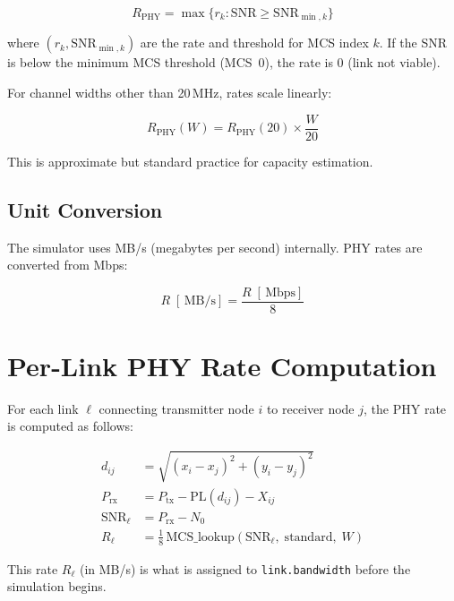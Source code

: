 \documentclass[11pt,letterpaper]{article}
\newcommand{\Mbps}{\,\text{Mbps}}
\newcommand{\MBps}{\,\text{MB/s}}
\begin{document}
\begin{equation}
\label{eq:mcs_select}
R_\text{PHY} = \max\{r_k : \text{SNR} \geq \text{SNR}_{\min,k}\}
\end{equation}

where $(r_k, \text{SNR}_{\min,k})$ are the rate and threshold for MCS index
$k$.  If the SNR is below the minimum MCS threshold (MCS~0), the rate is 0
(link not viable).

For channel widths other than 20\,MHz, rates scale linearly:

\begin{equation}
\label{eq:cw_scale}
R_\text{PHY}(W) = R_\text{PHY}(20) \times \frac{W}{20}
\end{equation}

This is approximate but standard practice for capacity estimation.

\subsection{Unit Conversion}

The simulator uses MB/s (megabytes per second) internally.  PHY rates are
converted from Mbps:

\begin{equation}
\label{eq:unit}
R\;[\MBps] = \frac{R\;[\Mbps]}{8}
\end{equation}

\section{Per-Link PHY Rate Computation}
\label{sec:phyrate}

For each link $\ell$ connecting transmitter node $i$ to receiver node $j$,
the PHY rate is computed as follows:

\begin{align}
d_{ij}    &= \sqrt{(x_i - x_j)^2 + (y_i - y_j)^2} \label{eq:dist} \\
P_\text{rx} &= P_\text{tx} - \text{PL}(d_{ij}) - X_{ij} \label{eq:prx_link} \\
\text{SNR}_\ell &= P_\text{rx} - N_0 \label{eq:snr_link} \\
R_\ell  &= \frac{1}{8}\,\text{MCS\_lookup}(\text{SNR}_\ell,\; \text{standard},\; W)
  \label{eq:rate_link}
\end{align}

This rate $R_\ell$ (in MB/s) is what is assigned to \texttt{link.bandwidth}
before the simulation begins.
\end{document}
